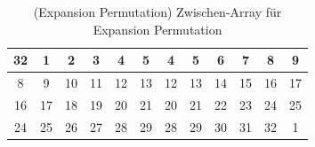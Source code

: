 \begin{table}[h]
    \centering
    \begin{tabular}{|*{12}{c|}}
        \hline
        \cellcolor{green-1}32 & \cellcolor{red-1}1 & \cellcolor{red-1}2 & \cellcolor{red-1}3 & \cellcolor{red-1}4 & \cellcolor{red-1}5 & 
        \cellcolor{red-1}4 & \cellcolor{red-1}5 & \cellcolor{red-1}6 & \cellcolor{red-1}7 & \cellcolor{red-1}8 & \cellcolor{orange-1}9\\
        \hline 
        \cellcolor{red-1}8 & \cellcolor{orange-1}9 & \cellcolor{orange-1}10 & \cellcolor{orange-1}11 & \cellcolor{orange-1}12 & \cellcolor{orange-1}13 &
        \cellcolor{orange-1}12 & \cellcolor{orange-1}13 & \cellcolor{orange-1}14 & \cellcolor{orange-1}15 & \cellcolor{orange-1}16 & \cellcolor{yellow-1}17 \\
        \hline 
        \cellcolor{orange-1}16 & \cellcolor{yellow-1}17 & \cellcolor{yellow-1}18 & \cellcolor{yellow-1}19 & \cellcolor{yellow-1}20 & \cellcolor{yellow-1}21 & 
        \cellcolor{yellow-1}20 & \cellcolor{yellow-1}21 & \cellcolor{yellow-1}22 & \cellcolor{yellow-1}23 & \cellcolor{yellow-1}24 & \cellcolor{green-1}25\\
        \hline
        \cellcolor{yellow-1}24 & \cellcolor{green-1}25 & \cellcolor{green-1}26 & \cellcolor{green-1}27 & \cellcolor{green-1}28 & \cellcolor{green-1}29 &
         \cellcolor{green-1}28 & \cellcolor{green-1}29 & \cellcolor{green-1}30 & \cellcolor{green-1}31 & \cellcolor{green-1}32 & \cellcolor{red-1}1\\
        \hline 
    \end{tabular}
    \caption{(Expansion Permutation) Zwischen-Array für Expansion Permutation}
\end{table}

